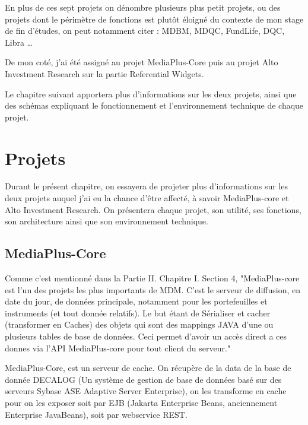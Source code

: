 \par En plus de ces sept projets on dénombre plusieurs plus petit projets, ou des projets dont le périmètre de fonctions est plutôt éloigné du contexte de mon stage de fin d'études, on peut notamment citer : MDBM, MDQC, FundLife, DQC, Libra \dots   
\par De mon coté, j'ai été assigné au projet MediaPlus-Core puis au projet Alto Investment Research sur la partie Referential Widgets.
\par Le chapitre suivant apportera plus d'informations sur les deux projets, ainsi que des schémas expliquant le fonctionnement et l'environnement technique de chaque projet.


\chapter{Projets}
\par Durant le présent chapitre, on essayera de projeter plus d'informations sur les deux projets auquel j'ai eu la chance d'être affecté, à savoir MediaPlus-core et Alto Investment Research. On présentera chaque projet, son utilité, ses fonctions, son architecture ainsi que son environnement technique.
\section{MediaPlus-Core}
\par Comme c'est mentionné dans la Partie II. Chapitre I. Section 4, "MediaPlus-core est l'un des projets les plus importants de MDM. C'est le serveur de diffusion, en date du jour, de données principale, notamment pour les portefeuilles et instruments (et tout donnée relatifs). Le but étant de Sérialiser et cacher (transformer en Caches) des objets qui sont des mappings JAVA d'une ou plusieurs tables de base de données. Ceci permet d'avoir un accès direct a ces donnes via l'API MediaPlus-core pour tout client du serveur." 
\par MediaPlus-Core, est un serveur de cache. On récupère de la data de la base de donnée DECALOG (Un système de gestion de base de données basé sur des serveurs Sybase ASE Adaptive Server Enterprise), on les transforme en cache pour on les exposer soit par EJB (Jakarta Enterprise Beans, anciennement Enterprise JavaBeans), soit par webservice REST.
\clearpage
